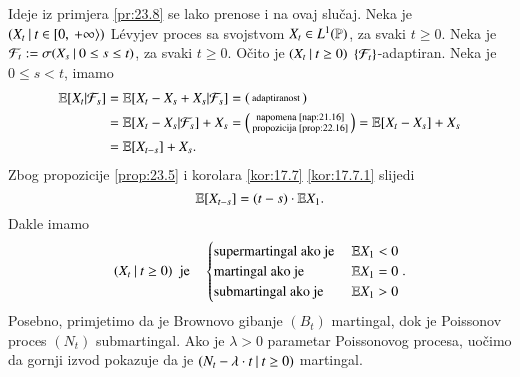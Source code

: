\begin{pr} \label{pr:23.9}
    Ideje iz primjera \ref{pr:23.8} se lako prenose i na ovaj slu\v caj.
    Neka je $({X_t} \: | \: {t \in [ {0}, \: {+\infty} \rangle})$ L\' evyjev proces sa svojstvom $X_t \in L^1 (\mathbb{P})$, za svaki $t \geq 0$.
    Neka je $\mathcal{F}_t := \sigma({X_s} \: | \: {0 \leq s \leq t})$, za svaki $t \geq 0$.
    O\v cito je $({X_t} \: | \: {t \geq 0})$ $\{\mathcal{F}_t\}$-adaptiran.
    Neka je $0 \leq s < t$, imamo
    \begin{equation*}
        \begin{aligned}
            \mathbb{E} [X_t | \mathcal{F}_s] &= \mathbb{E} [X_t - X_s + X_s | \mathcal{F}_s] =
            \begin{psmallmatrix}
                \textnormal{adaptiranost}
            \end{psmallmatrix}\\
            &= \mathbb{E} [X_t - X_s | \mathcal{F}_s] + X_s =
            \begin{psmallmatrix}
                \textnormal{napomena \ref{nap:21.16}}\\
                \textnormal{propozicija \ref{prop:22.16}}
            \end{psmallmatrix}
            = \mathbb{E} [X_t - X_s] + X_s\\
            &= \mathbb{E} [X_{t - s}] + X_s.
        \end{aligned}
    \end{equation*}
    Zbog propozicije \ref{prop:23.5} i korolara \ref{kor:17.7} \ref{kor:17.7.1} slijedi
    \begin{equation*}
        \mathbb{E} [X_{t - s}] = (t - s) \cdot \mathbb{E} X_1.
    \end{equation*}
    Dakle imamo
    \begin{equation*}
        ({X_t} \: | \: { t \geq 0}) \; \textnormal{ je} \quad
        \begin{cases}
            \textnormal{supermartingal ako je } &\mathbb{E} X_1 < 0\\
            \textnormal{martingal ako je } &\mathbb{E} X_1 = 0\\
            \textnormal{submartingal ako je } &\mathbb{E} X_1 > 0
        \end{cases}.
    \end{equation*}
    Posebno, primjetimo da je Brownovo gibanje $(B_t)$ martingal, dok je Poissonov proces $(N_t)$ submartingal.
    Ako je $\lambda > 0$ parametar Poissonovog procesa, uo\v cimo da gornji izvod pokazuje da je $({N_t - \lambda \cdot t} \: | \: {t \geq 0})$ martingal.
\end{pr}